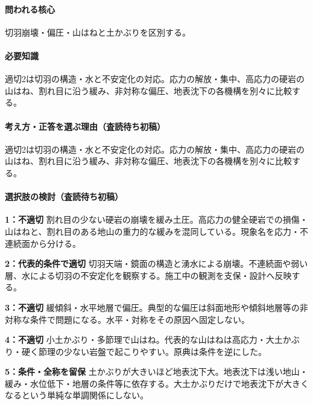 \paragraph{問われる核心} 切羽崩壊・偏圧・山はねと土かぶりを区別する。

\paragraph{必要知識} 適切2は切羽の構造・水と不安定化の対応。応力の解放・集中、高応力の硬岩の山はね、割れ目に沿う緩み、非対称な偏圧、地表沈下の各機構を別々に比較する。

\paragraph{考え方・正答を選ぶ理由（査読待ち初稿）} 適切2は切羽の構造・水と不安定化の対応。応力の解放・集中、高応力の硬岩の山はね、割れ目に沿う緩み、非対称な偏圧、地表沈下の各機構を別々に比較する。

\paragraph{選択肢の検討（査読待ち初稿）}\mbox{}\par

\noindent\textbf{1：不適切} 割れ目の少ない硬岩の崩壊を緩み土圧。高応力の健全硬岩での損傷・山はねと、割れ目のある地山の重力的な緩みを混同している。現象名を応力・不連続面から分ける。\par

\noindent\textbf{2：代表的条件で適切} 切羽天端・鏡面の構造と湧水による崩壊。不連続面や弱い層、水による切羽の不安定化を観察する。施工中の観測を支保・設計へ反映する。\par

\noindent\textbf{3：不適切} 緩傾斜・水平地層で偏圧。典型的な偏圧は斜面地形や傾斜地層等の非対称な条件で問題になる。水平・対称をその原因へ固定しない。\par

\noindent\textbf{4：不適切} 小土かぶり・多節理で山はね。代表的な山はねは高応力・大土かぶり・硬く節理の少ない岩盤で起こりやすい。原典は条件を逆にした。\par

\noindent\textbf{5：条件・全称を留保} 土かぶりが大きいほど地表沈下大。地表沈下は浅い地山・緩み・水位低下・地層の条件等に依存する。大土かぶりだけで地表沈下が大きくなるという単純な単調関係にしない。\par

